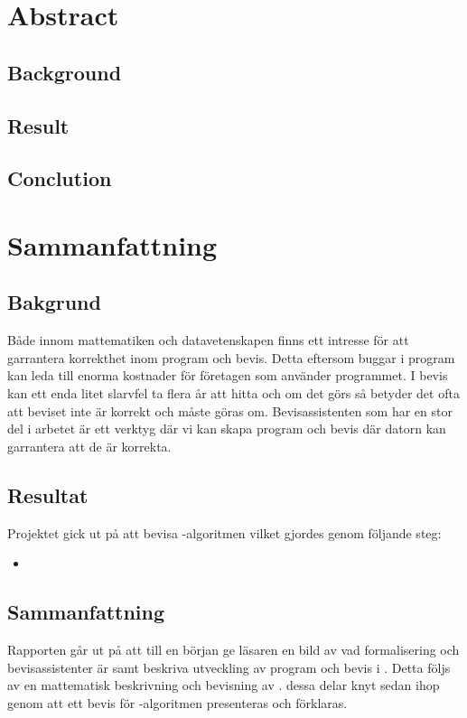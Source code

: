\section{Abstract}

\subsection{Background}

\subsection{Result}

\subsection{Conclution}



\section{Sammanfattning}

\subsection{Bakgrund}
Både innom mattematiken och datavetenskapen finns ett intresse
för att garrantera korrekthet inom program och bevis. Detta
eftersom buggar i program kan leda till enorma kostnader för
företagen som använder programmet. I bevis kan ett enda litet
slarvfel ta flera år att hitta och om det görs så betyder det
ofta att beviset inte är korrekt och måste göras om.
Bevisassistenten \coq som har en stor del i arbetet är ett
verktyg där vi kan skapa program och bevis där datorn kan
garrantera att de är korrekta.

\subsection{Resultat}
Projektet gick ut på att bevisa \toom -algoritmen vilket gjordes
genom följande steg:
\begin{itemize}
\item 
\end{itemize}


\subsection{Sammanfattning}
Rapporten går ut på att till en början ge läsaren en bild av vad
formalisering och bevisassistenter är samt beskriva utveckling av program
och bevis i \coq. Detta följs av en mattematisk beskrivning
och bevisning av \toom. dessa delar knyt sedan ihop genom att
ett bevis för \toom -algoritmen presenteras och förklaras.
